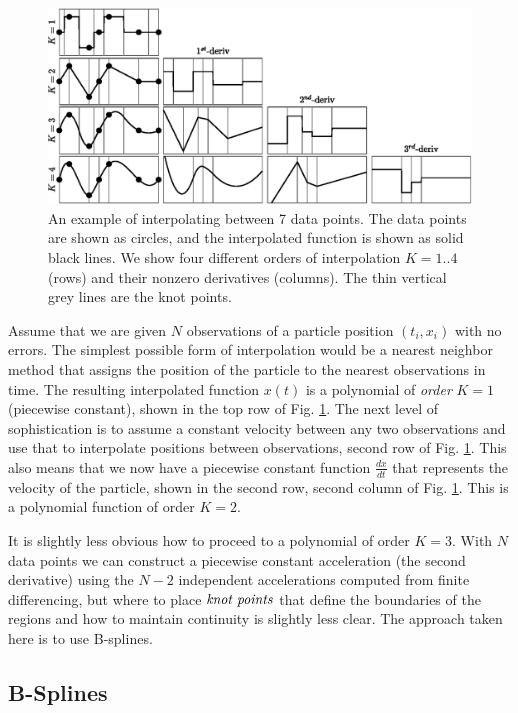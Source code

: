 \documentclass{ametsoc}
\begin{document}
\begin{figure}[h]
  \centerline{\includegraphics[width=39pc,angle=0]{interpolation.eps}}
  \caption{An example of interpolating between 7 data points. The data points are shown as circles, and the interpolated function is shown as solid black lines. We show four different orders of interpolation $K=1..4$ (rows) and their nonzero derivatives (columns). The thin vertical grey lines are the knot points.}
  \label{interpolation}
\end{figure}

Assume that we are given $N$ observations of a particle position $(t_i,x_i)$ with no errors. The simplest possible form of interpolation would be a nearest neighbor method that assigns the position of the particle to the nearest observations in time. The resulting interpolated function $x(t)$ is a polynomial of \emph{order} $K=1$ (piecewise constant), shown in the top row of Fig. \ref{interpolation}. The next level of sophistication is to assume a constant velocity between any two observations and use that to interpolate positions between observations, second row of Fig. \ref{interpolation}. This also means that we now have a piecewise constant function $\frac{dx}{dt}$ that represents the velocity of the particle, shown in the second row, second column of Fig.  \ref{interpolation}. This is a polynomial function of order $K=2$.

It is slightly less obvious how to proceed to a polynomial of order $K=3$. With $N$ data points we can construct a piecewise constant acceleration (the second derivative) using the $N-2$ independent accelerations computed from finite differencing, but where to place $\emph{knot points}$ that define the boundaries of the regions and how to maintain continuity is slightly less clear. The approach taken here is to use B-splines.

\subsection{B-Splines}
\end{document}
